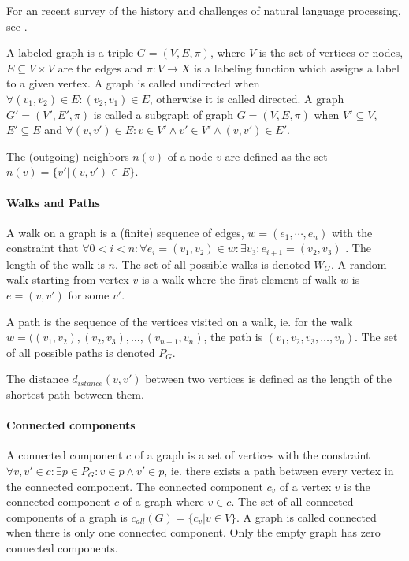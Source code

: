 For an recent survey of the history and challenges of natural language processing, see \cite{Chowdhury2003,DeCastilho2014}.

A labeled graph \cite[p.~1]{Bondy1976} is a triple $G = (V, E, \pi)$, where $V$ is the set of vertices or nodes, $E \subseteq V \times V$ are the edges and $\pi: V \to X$ is a labeling function which assigns a label to a given vertex. 
A graph is called undirected when $\forall (v_1, v_2) \in E: (v_2, v_1) \in E$, otherwise it is called directed. 
A graph $G'=(V', E', \pi)$ is called a subgraph of graph $G = (V, E, \pi)$ when $V' \subseteq V$, $E' \subseteq E$ and $\forall (v, v') \in E: v \in V' \land v' \in V' \land (v, v') \in E'$.

The (outgoing) neighbors $n(v)$ of a node $v$ are defined as the set $n(v) = \{v' | (v, v') \in E \}$.

\paragraph{Walks and Paths}
A walk on a graph is a (finite) sequence of edges, $w = (e_1, \cdots, e_n)$ with the constraint that $\forall 0 < i < n: \forall e_i = (v_1, v_2) \in w: \exists v_3: e_{i + 1} = (v_2, v_3)$ \cite{Vishwanathan2006}	. The length of the walk is $n$.
The set of all possible walks is denoted $W_G$.
A random walk \cite{Vishwanathan2006} starting from vertex $v$ is a walk where the first element of walk $w$ is $e = (v, v')$ for some $v'$.

A path is the sequence of the vertices visited on a walk, ie. for the walk $w = ((v_1, v_2), (v_2, v_3), \dots, (v_{n-1}, v_n)$, the path is $(v_1, v_2, v_3, \dots, v_n)$.
The set of all possible paths is denoted $P_G$.

The distance $d_{istance}(v, v')$ between two vertices is defined as the length of the shortest path between them.

\paragraph{Connected components}
A connected component $c$ of a graph is a set of vertices with the constraint $\forall v, v' \in c: \exists p \in P_G: v \in p \land v' \in p$, ie. there exists a path between every vertex in the connected component.
The connected component $c_v$ of a vertex $v$ is the connected component $c$ of a graph where $v \in c$.
The set of all connected components of a graph is $c_{all}(G) = \{ c_v | v \in V \}$. A graph is called connected when there is only one connected component. Only the empty graph has zero connected components.

